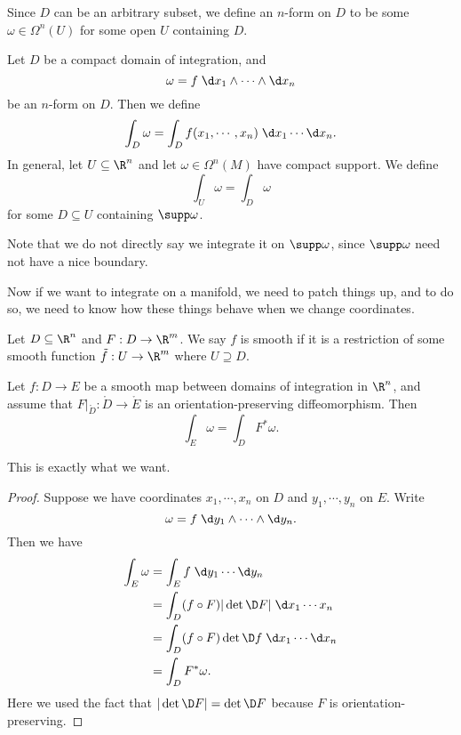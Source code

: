 \documentclass[a4paper]{article}
\begin{document}
Since $D$ can be an arbitrary subset, we define an $n$-form on $D$ to be some $\omega \in \Omega^n(U)$ for some open $U$ containing $D$.

\begin{defi}[Integration on $R^n$]
  Let $D$ be a compact domain of integration, and
  \[
    \omega = f\; \d x_1 \wedge \cdots \wedge \d x_n
  \]
  be an $n$-form on $D$. Then we define
  \[
    \int_D \omega = \int_D f(x_1, \cdots, x_n) \;\d x_1 \cdots \d x_n.
  \]
  In general, let $U \subseteq \R^n$ and let $\omega \in \Omega^n(M)$ have compact support. We define
  \[
    \int_U \omega = \int_D \omega
  \]
  for some $D\subseteq U$ containing $\supp \omega$.
\end{defi}
Note that we do not directly say we integrate it on $\supp \omega$, since $\supp \omega$ need not have a nice boundary.

Now if we want to integrate on a manifold, we need to patch things up, and to do so, we need to know how these things behave when we change coordinates.

\begin{defi}
  Let $D \subseteq \R^n$ and $F: D \to \R^m$. We say $f$ is smooth if it is a restriction of some smooth function $\tilde{f}: U \to \R^m$ where $U \supseteq D$.
\end{defi}

\begin{lemma}
  Let $f: D \to E$ be a smooth map between domains of integration in $\R^n$, and assume that $F|_{\mathring{D}}: \mathring{D} \to \mathring{E}$ is an orientation-preserving diffeomorphism. Then
  \[
    \int_E \omega = \int_D F^* \omega.
  \]
\end{lemma}
This is exactly what we want.

\begin{proof}
  Suppose we have coordinates $x_1, \cdots, x_n$ on $D$ and $y_1, \cdots, y_n$ on $E$. Write
  \[
    \omega = f\;\d y_1 \wedge \cdots \wedge \d y_n.
  \]
  Then we have
  \begin{align*}
    \int_E \omega &= \int_E f\;\d y_1 \cdots \d y_n\\
    &= \int_D (f \circ F)|\det \D F|\;\d x_1 \cdots x_n\\
    &= \int_D (f \circ F) \det \D f \; \d x_1 \cdots \d x_n\\
    &= \int_D F^* \omega.
  \end{align*}
  Here we used the fact that $|\det \D F| = \det \D F$ because $F$ is orientation-preserving.
\end{proof}
\end{document}
